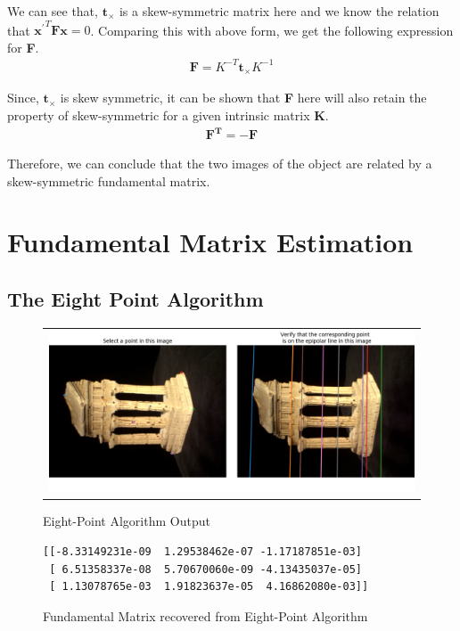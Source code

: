 \documentclass[a4paper]{article}
\begin{document}
We can see that, $\mathbf { t _ {\times} }$ is a skew-symmetric matrix here and we know the relation that $\mathbf{x^{\prime}} ^ { T }\mathbf{F}\mathbf{x}=0$. Comparing this with above form, we get the following expression for \textbf{F}.
\begin{gather}
    \mathbf{F} = K ^ { - T } \mathbf{t_{\times}} K ^ { - 1 }
\end{gather}

Since, $\mathbf { t _ {\times} }$ is skew symmetric, it can be shown that \textbf{F} here will also retain the property of skew-symmetric for a given intrinsic matrix \textbf{K}.
\begin{gather}
    \mathbf{F ^ { T }} = -\mathbf{F}
\end{gather}

Therefore, we can conclude that the two images of the object are related by a skew-symmetric fundamental matrix.

\section{Fundamental Matrix Estimation}
\subsection{The Eight Point Algorithm}
\begin{figure}[!ht]
\centering
\begin{tabular}{c}
{\includegraphics[width=\textwidth]{images/eightpoint.png}}
\end{tabular}
\caption{Eight-Point Algorithm Output}
\end{figure}

\begin{figure}[!ht]
\centering
\begin{BVerbatim}
[[-8.33149231e-09  1.29538462e-07 -1.17187851e-03]
 [ 6.51358337e-08  5.70670060e-09 -4.13435037e-05]
 [ 1.13078765e-03  1.91823637e-05  4.16862080e-03]]
\end{BVerbatim}
\caption{Fundamental Matrix recovered from Eight-Point Algorithm}
\end{figure}
\end{document}
